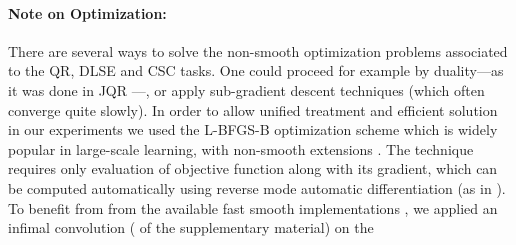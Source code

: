 \paragraph{Note on Optimization:}
There are several ways to solve the non-smooth optimization problems  associated
to the \ac{QR}, \ac{DLSE} and \ac{CSC} tasks. One could proceed for example by
duality---as it was done in JQR \citet{sangnier2016joint}---, or apply
sub-gradient descent techniques (which often converge quite slowly). In order
to allow unified treatment and efficient solution
%
in our experiments we used the \acs{L-BFGS-B} \citep{zhu1997algorithm}
optimization scheme which is widely popular in large-scale learning, with
non-smooth extensions \citep{skajaa2010limited,keskar2017limited}. The
technique requires only evaluation of objective function along with its
gradient, which can be computed automatically using reverse mode automatic
differentiation (as in \citet{abadi2016tensorflow}). To benefit from  from the
available fast smooth implementations \citep{jones2014scipy,fei2014parallel},
we applied an infimal convolution
( of the supplementary material) on the
